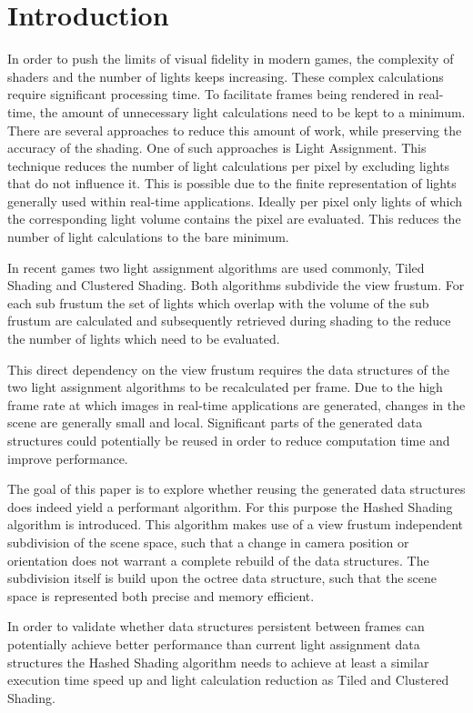 \section{Introduction}

In order to push the limits of visual fidelity in modern games, the complexity
of shaders and the number of lights keeps increasing. These complex calculations
require significant processing time. To facilitate frames being rendered in
real-time, the amount of unnecessary light calculations need to be kept to a
minimum. There are several approaches to reduce this amount of work, while
preserving the accuracy of the shading. One of such approaches is Light
Assignment. This technique reduces the number of light calculations per pixel by
excluding lights that do not influence it. This is possible due to the finite
representation of lights generally used within real-time applications. Ideally
per pixel only lights of which the corresponding light volume contains the pixel
are evaluated. This reduces the number of light calculations to the bare minimum.

In recent games two light assignment algorithms are used commonly, Tiled
Shading\cite{olsson2011tiled} and Clustered Shading\cite{olsson2012clustered}.
Both algorithms subdivide the view frustum. For each sub frustum the set of
lights which overlap with the volume of the sub frustum are calculated and
subsequently retrieved during shading to the reduce the number of lights which
need to be evaluated.

This direct dependency on the view frustum requires the data structures of the
two light assignment algorithms to be recalculated per frame. Due to the high
frame rate at which images in real-time applications are generated, changes in
the scene are generally small and local. Significant parts of the generated data
structures could potentially be reused in order to reduce computation time and
improve performance.

The goal of this paper is to explore whether reusing the generated data
structures does indeed yield a performant algorithm. For this purpose the Hashed
Shading algorithm is introduced. This algorithm makes use of a view frustum
independent subdivision of the scene space, such that a change in camera
position or orientation does not warrant a complete rebuild of the data
structures. The subdivision itself is build upon the octree data structure, such
that the scene space is represented both precise and memory efficient.

In order to validate whether data structures persistent between frames can
potentially achieve better performance than current light assignment data
structures the Hashed Shading algorithm needs to achieve at least a similar
execution time speed up and light calculation reduction as Tiled and Clustered
Shading.



